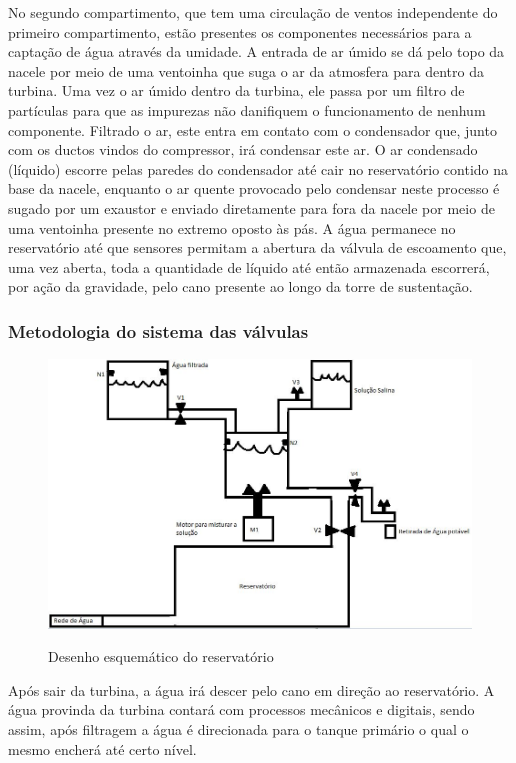 	No segundo compartimento, que tem uma circulação de ventos independente do primeiro compartimento, estão presentes os componentes necessários para a captação de água através da umidade. A entrada de ar úmido se dá pelo topo da nacele por meio de uma ventoinha que suga o ar da atmosfera para dentro da turbina. Uma vez o ar úmido dentro da turbina, ele passa por um filtro de partículas para que as impurezas não danifiquem o funcionamento de nenhum componente. Filtrado o ar, este entra em contato com o condensador que, junto com os ductos vindos do compressor, irá condensar este ar. O ar condensado (líquido) escorre pelas paredes do condensador até cair no reservatório contido na base da nacele, enquanto o ar quente provocado pelo condensar neste processo é sugado por um exaustor e enviado diretamente para fora da nacele por meio de uma ventoinha presente no extremo oposto às pás. A água permanece no reservatório até que sensores permitam a abertura da válvula de escoamento que, uma vez aberta, toda a quantidade de líquido até então armazenada escorrerá, por ação da gravidade, pelo cano presente ao longo da torre de sustentação.
	\subsubsection{Metodologia do sistema das válvulas}
\FloatBarrier
\begin{figure}[!h]
      \centering
      \includegraphics[scale = 0.6]{editaveis/figuras/reservatorio}
      \label{funcionamento_reservatorio}
      \caption[Esquemático Reservatório]{Desenho esquemático do reservatório}
    \end{figure}
    \FloatBarrier	
    
Após sair da turbina, a água irá descer pelo cano em direção ao reservatório. A água provinda da turbina contará com processos mecânicos e digitais, sendo assim, após filtragem a água é direcionada para o tanque primário o qual o mesmo encherá até certo nível.

